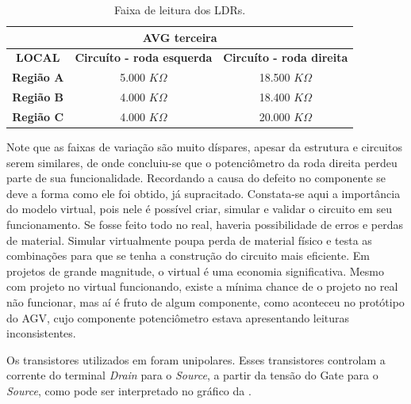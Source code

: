 \documentclass[portuguese]{textolivre}
\begin{document}
\begin{table}[htpb]
\caption{Faixa de leitura dos LDRs.}
\label{tabela1}
\centering
\begin{tabular}{c c c}
\hline
\multicolumn{3}{c}{\cellcolor[HTML]{CFE7F5} \textbf{AVG terceira}}                         \\ \hline
\rowcolor[HTML]{CFE7F5} 
\textbf{LOCAL} & \multicolumn{1}{|c|}{\cellcolor[HTML]{CFE7F5} \textbf{Circuíto - roda esquerda}} & \multicolumn{1}{c}{\cellcolor[HTML]{CFE7F5} \textbf{Circuíto - roda direita}} \\ \hline
\cellcolor[HTML]{CFE7F5} \textbf{Região A} & \multicolumn{1}{|c|}{5.000  $K\Omega$} & 18.500 $K\Omega$ \\ \hline
\cellcolor[HTML]{CFE7F5} \textbf{Região B} & \multicolumn{1}{|c|}{4.000 $K\Omega$} & 18.400 $K\Omega$ \\ \hline
\cellcolor[HTML]{CFE7F5} \textbf{Região C} & \multicolumn{1}{|c|}{4.000 $K\Omega$} & 20.000 $K\Omega$ \\ \hline
\end{tabular}%
\end{table}

Note que as faixas de variação são muito díspares, apesar da estrutura e circuitos serem similares, de onde concluiu-se que o potenciômetro da roda direita perdeu parte de sua funcionalidade. Recordando a causa do defeito no componente se deve a forma como ele foi obtido, já supracitado. Constata-se aqui a importância do modelo virtual, pois nele é possível criar, simular e validar o circuito em seu funcionamento. Se fosse feito todo no real, haveria possibilidade de erros e perdas de material. Simular virtualmente poupa perda de material físico e testa as combinações para que se tenha a construção do circuito mais eficiente. Em projetos de grande magnitude, o virtual é uma economia significativa. Mesmo com projeto no virtual funcionando, existe a mínima chance de o projeto no real não funcionar, mas aí é fruto de algum componente, como aconteceu no protótipo do AGV, cujo componente potenciômetro estava apresentando leituras inconsistentes.

Os transistores utilizados em \textcite{AlvesMonica2022} foram unipolares. Esses transistores controlam a corrente do terminal \emph{Drain} para o \emph{Source}, a partir da tensão do Gate para o \emph{Source}, como pode ser interpretado no gráfico da .
\end{document}
